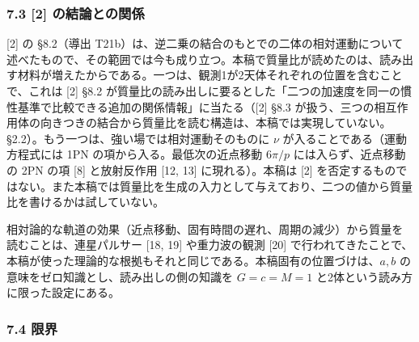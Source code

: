 \documentclass[
  a4paper,
]{ltjsarticle}
\begin{document}
\subsubsection{7.3 {[}2{]}
の結論との関係}\label{ux306eux7d50ux8ad6ux3068ux306eux95a2ux4fc2}

{[}2{]} の §8.2（導出
T21b）は、逆二乗の結合のもとでの二体の相対運動について述べたもので、その範囲では今も成り立つ。本稿で質量比が読めたのは、読み出す材料が増えたからである。一つは、観測1が2天体それぞれの位置を含むことで、これは
{[}2{]} §8.2
が質量比の読み出しに要るとした「二つの加速度を同一の慣性基準で比較できる追加の関係情報」に当たる（{[}2{]}
§8.3
が扱う、三つの相互作用体の向きつきの結合から質量比を読む構造は、本稿では実現していない。§2.2）。もう一つは、強い場では相対運動そのものに
\(\nu\) が入ることである（運動方程式には 1PN
の項から入る。最低次の近点移動 \(6\pi/p\) には入らず、近点移動の 2PN
の項 {[}8{]} と放射反作用 {[}12, 13{]} に現れる）。本稿は {[}2{]}
を否定するものではない。また本稿では質量比を生成の入力として与えており、二つの値から質量比を書けるかは試していない。

相対論的な軌道の効果（近点移動、固有時間の遅れ、周期の減少）から質量を読むことは、連星パルサー
{[}18, 19{]} や重力波の観測 {[}20{]}
で行われてきたことで、本稿が使った理論的な根拠もそれと同じである。本稿固有の位置づけは、\(a, b\)
の意味をゼロ知識とし、読み出しの側の知識を \(G=c=M=1\)
と2体という読み方に限った設定にある。

\subsubsection{7.4 限界}\label{ux9650ux754c}
\end{document}
